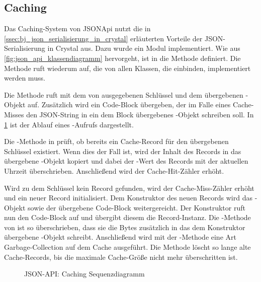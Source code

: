 \subsection{Caching}
\label{ssec:bj_caching}

Das Caching-System von JSONApi nutzt die in
\cref{ssec:bj_json_serialisierung_in_crystal} erläuterten Vorteile der
JSON-Serialisierung in Crystal aus.  Dazu wurde ein Modul 
implementiert.  Wie aus \cref{fig:json_api_klassendiagramm} hervorgeht,
ist in  die Methode  definiert.  Die Methode
ruft wiederum  auf, die von allen Klassen, die
 einbinden, implementiert werden muss.

Die Methode  ruft  mit dem von 
ausgegebenen Schlüssel und dem übergebenen -Objekt auf.  Zusätzlich
wird ein Code-Block übergeben, der im Falle eines Cache-Misses den JSON-String
in ein dem Block übergebenes -Objekt schreiben soll.  In
\cref{fig:json_api_caching_sequenzdiagramm} ist der Ablauf eines
-Aufrufs dargestellt.

Die -Methode in  prüft, ob bereits ein
Cache-Record für den übergebenen Schlüssel existiert.  Wenn dies der
Fall ist, wird der Inhalt des Records in das übergebene -Objekt
kopiert und dabei der -Wert des Records mit der aktuellen
Uhrzeit überschrieben.  Anschließend wird der Cache-Hit-Zähler erhöht.

Wird zu dem Schlüssel kein Record gefunden, wird der Cache-Miss-Zähler erhöht
und ein neuer Record initialisiert.  Dem Konstruktor des neuen Records wird das
-Objekt sowie der übergebene Code-Block weitergereicht.  Der
Konstruktor ruft nun den Code-Block auf und übergibt diesem die Record-Instanz.
Die -Methode von  ist so überschrieben, dass
sie die Bytes zusätzlich in das dem Konstruktor übergebene -Objekt
schreibt.  Anschließend wird mit der -Methode eine Art
Garbage-Collection auf dem Cache ausgeführt.  Die Methode löscht so lange alte
Cache-Records, bis die maximale Cache-Größe nicht mehr überschritten ist.

\begin{figure}
	\center
	
	\caption{JSON-API: Caching Sequenzdiagramm}
	\label{fig:json_api_caching_sequenzdiagramm}
\end{figure}
